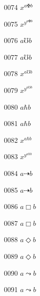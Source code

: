 \documentclass{article}
\begin{document}
0074 $x^{a\maltese b}$\par
0075 $x^{y^{a\maltese b}}$\par
0076 $a\mho b$\par
0077 $\displaystyle a\mho b$\par
0078 $x^{a\mho b}$\par
0079 $x^{y^{a\mho b}}$\par
0080 $a\hbar b$\par
0081 $\displaystyle a\hbar b$\par
0082 $x^{a\hbar b}$\par
0083 $x^{y^{a\hbar b}}$\par
0084 $a\dasharrow b$\par
0085 $\displaystyle a\dasharrow b$\par
0086 $a\Box b$\par
0087 $\displaystyle a\Box b$\par
0088 $a\Diamond b$\par
0089 $\displaystyle a\Diamond b$\par
0090 $a\leadsto b$\par
0091 $\displaystyle a\leadsto b$\par
\end{document}
